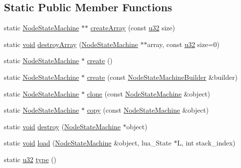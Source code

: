 \subsection*{Static Public Member Functions}
\begin{DoxyCompactItemize}
\item 
static \mbox{\hyperlink{classnjli_1_1_node_state_machine}{Node\+State\+Machine}} $\ast$$\ast$ \mbox{\hyperlink{classnjli_1_1_node_state_machine_ad5c7d8fcb8a5e273ca9e6d847bb53f01}{create\+Array}} (const \mbox{\hyperlink{_util_8h_a10e94b422ef0c20dcdec20d31a1f5049}{u32}} size)
\item 
static \mbox{\hyperlink{_thread_8h_af1e856da2e658414cb2456cb6f7ebc66}{void}} \mbox{\hyperlink{classnjli_1_1_node_state_machine_a79dabd3b695231fa3700098199574caa}{destroy\+Array}} (\mbox{\hyperlink{classnjli_1_1_node_state_machine}{Node\+State\+Machine}} $\ast$$\ast$array, const \mbox{\hyperlink{_util_8h_a10e94b422ef0c20dcdec20d31a1f5049}{u32}} size=0)
\item 
static \mbox{\hyperlink{classnjli_1_1_node_state_machine}{Node\+State\+Machine}} $\ast$ \mbox{\hyperlink{classnjli_1_1_node_state_machine_ad5595d3273e958005648a848bf8d8c9d}{create}} ()
\item 
static \mbox{\hyperlink{classnjli_1_1_node_state_machine}{Node\+State\+Machine}} $\ast$ \mbox{\hyperlink{classnjli_1_1_node_state_machine_a730ed058da4c921083b93eb7b90a62c4}{create}} (const \mbox{\hyperlink{classnjli_1_1_node_state_machine_builder}{Node\+State\+Machine\+Builder}} \&builder)
\item 
static \mbox{\hyperlink{classnjli_1_1_node_state_machine}{Node\+State\+Machine}} $\ast$ \mbox{\hyperlink{classnjli_1_1_node_state_machine_a5fd34376d9ddab87af68c8e02b43e540}{clone}} (const \mbox{\hyperlink{classnjli_1_1_node_state_machine}{Node\+State\+Machine}} \&object)
\item 
static \mbox{\hyperlink{classnjli_1_1_node_state_machine}{Node\+State\+Machine}} $\ast$ \mbox{\hyperlink{classnjli_1_1_node_state_machine_a233206f0db79b5aa14486b7aa8167578}{copy}} (const \mbox{\hyperlink{classnjli_1_1_node_state_machine}{Node\+State\+Machine}} \&object)
\item 
static \mbox{\hyperlink{_thread_8h_af1e856da2e658414cb2456cb6f7ebc66}{void}} \mbox{\hyperlink{classnjli_1_1_node_state_machine_ad8f04819d6afdbea47415ab4004fde0d}{destroy}} (\mbox{\hyperlink{classnjli_1_1_node_state_machine}{Node\+State\+Machine}} $\ast$object)
\item 
static \mbox{\hyperlink{_thread_8h_af1e856da2e658414cb2456cb6f7ebc66}{void}} \mbox{\hyperlink{classnjli_1_1_node_state_machine_a2fb819c35b3036d119fe7ef4939ec9f1}{load}} (\mbox{\hyperlink{classnjli_1_1_node_state_machine}{Node\+State\+Machine}} \&object, lua\+\_\+\+State $\ast$L, int stack\+\_\+index)
\item 
static \mbox{\hyperlink{_util_8h_a10e94b422ef0c20dcdec20d31a1f5049}{u32}} \mbox{\hyperlink{classnjli_1_1_node_state_machine_a79ac2de5c4c13157efc5c012e299bbc7}{type}} ()
\end{DoxyCompactItemize}
